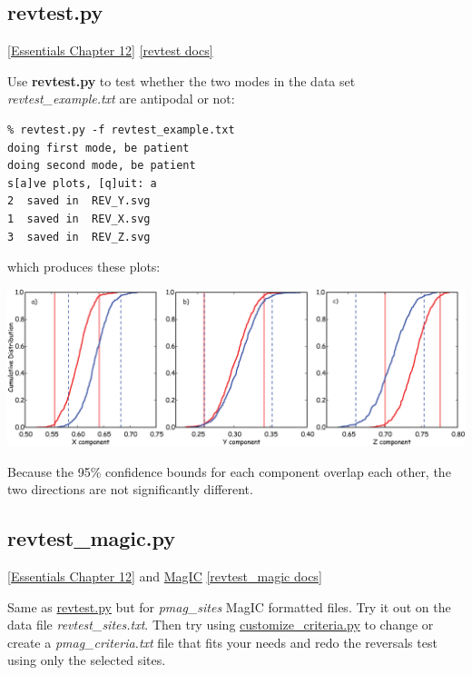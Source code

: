 \documentclass[11pt]{book}
\begin{document}
{{{\subsection{revtest.py}
\href{http://magician.ucsd.edu/Essentials_2/WebBook2ch12.html#ch12}{[Essentials Chapter 12]}
\href{http://earthref.org/PmagPy/pmagpydocs/revtest-module.html}{[revtest docs]}

Use {\bf revtest.py} to test whether the two modes in the data set {\it revtest\_example.txt} are antipodal or not:

\begin{verbatim}
% revtest.py -f revtest_example.txt 
doing first mode, be patient
doing second mode, be patient
s[a]ve plots, [q]uit: a
2  saved in  REV_Y.svg
1  saved in  REV_X.svg
3  saved in  REV_Z.svg

\end{verbatim}

\noindent which produces these plots:

{ %
\includegraphics[width=15cm]{EPSfiles/revtest.eps}}

Because the 95\% confidence bounds for each component overlap each other, the two directions are not significantly different.   

\subsection{revtest\_magic.py} 
\href{http://magician.ucsd.edu/Essentials_2/WebBook2ch12.html#ch12}{ [Essentials Chapter 12]} and \href{#MagIC}{MagIC}
\href{http://earthref.org/PmagPy/pmagpydocs/revtest_magic-module.html}{[revtest\_magic docs]}

Same as \href{#revtest.py}{revtest.py} but for {\it pmag\_sites} MagIC formatted files.   Try it out on the data file {\it revtest\_sites.txt}.  Then try using \href{#customize_criteria.py}{customize\_criteria.py} to change or create a {\it pmag\_criteria.txt} file that fits your needs and redo the reversals test using only the selected sites.   

}}}
\end{document}
